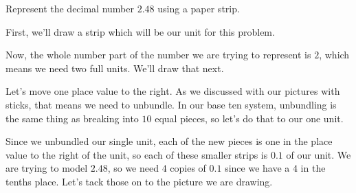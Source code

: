 \documentclass{ximera}
\begin{document}
\begin{image}
\end{image}


\begin{example}
Represent the decimal number $2.48$ using a paper strip.


First, we'll draw a strip which will be our unit for this problem.

\begin{image}
\end{image}

Now, the whole number part of the number we are trying to represent is $2$, which means we need two full units. We'll draw that next.

\begin{image}
\end{image}

Let's move one place value to the right. As we discussed with our pictures with sticks, that means we need to unbundle. In our base ten system, unbundling is the same thing as breaking into $10$ equal pieces, so let's do that to our one unit.

\begin{image}
\end{image}

Since we unbundled our single unit, each of the new pieces is one in the place value to the right of the unit, so each of these smaller strips is $0.1$ of our unit. We are trying to model $2.48$, so we need $4$ copies of $0.1$ since we have a $4$ in the tenths place. Let's tack those on to the picture we are drawing.


\end{example}
\end{document}
